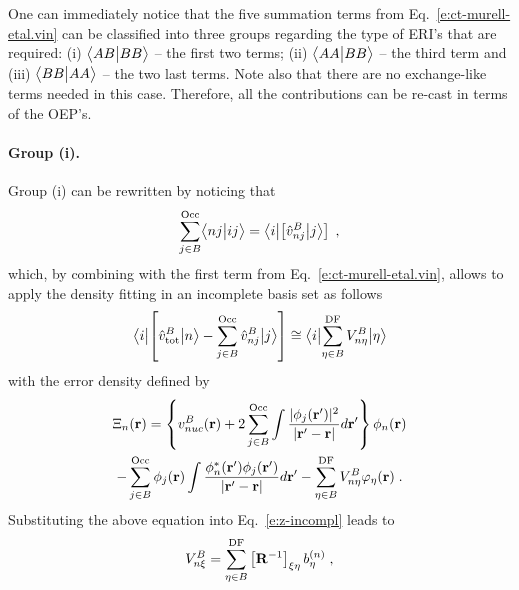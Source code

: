 One can immediately notice that the five summation terms
from Eq.~\eqref{e:ct-murell-etal.vin} can be classified into three groups
regarding the type of ERI's that are required:
(i) $\BraKet{AB}{BB}$ -- the first two terms;
(ii) $\BraKet{AA}{BB}$ -- the third term and
(iii) $\BraKet{BB}{AA}$ -- the two last terms. 
Note also that there are no exchange\hyp{}like terms needed in this case.
Therefore, all the contributions can be re\hyp{}cast in terms of the OEP's.

\paragraph{Group (i).}
Group (i) can be rewritten by noticing that
%
\begin{equation} \label{e:ct-murell-etal.group-i.notice}
 \sum_{j\in B}^{\rm Occ} 
 \BraKet{nj}{ij} =
 \Bra{i} \left[ \hat{v}^B_{nj} \Ket{j} \right]  \;,
\end{equation}
%
which, by combining with the first term from Eq.~\eqref{e:ct-murell-etal.vin}, 
allows to apply the density fitting in an
incomplete basis set as follows
%
\begin{equation} \label{e:v-oep.ct}
\Bra{i} \left[ \hat{v}^B_{\rm tot} \Ket{n} - \sum_{j\in B}^{\rm Occ} \hat{v}^B_{nj} \Ket{j} \right]
\cong \Bra{i} \sum_{\eta\in B}^{\rm DF} V^B_{n\eta} \Ket{\eta}
\end{equation}
%
with the error density defined by
%
\begin{multline}
 \Xi_n({\bf r}) = 
  \left\{
      v_{nuc}^B({\bf r}) + 2 \sum_{j\in B}^{\rm Occ}
   \int \frac{ \vert \phi_j({\bf r}') \vert^2 }{\vert {\bf r}' - {\bf r} \vert} d{\bf r}'
  \right\}
  \phi_n({{\bf r}})  \\
 - \sum_{j\in B}^{\rm Occ} \phi_j({{\bf r}})
   \int \frac{ \phi^*_n({\bf r}') \phi_j({{\bf r}'}) }{\vert {\bf r}' - {\bf r} \vert} d{\bf r}'
 - \sum_{\eta\in B}^{\rm DF} V^B_{n\eta} \varphi_\eta({\bf r}) \;.
\end{multline}
%
Substituting the above equation into Eq.~\eqref{e:z-incompl}
leads to
%
\begin{equation} \label{e:v-oep-group-1-prefinal}
 V^B_{n\xi} = \sum_{\eta\in B}^{\rm DF} \left[ {\bf R}^{-1} \right]_{\xi\eta} b_\eta^{(n)} \;,
\end{equation}
